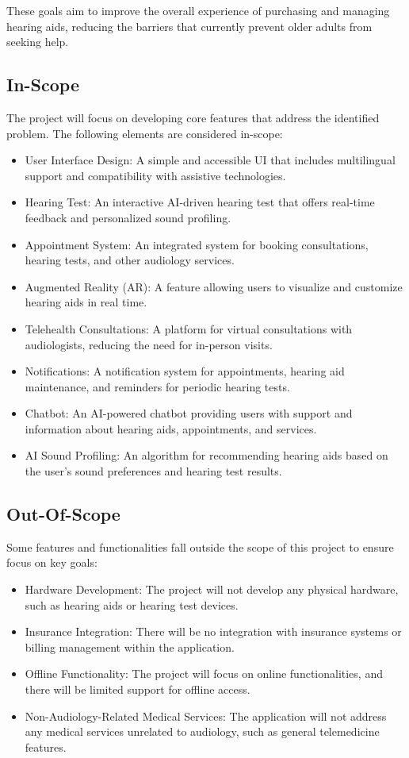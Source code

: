 \documentclass{article}
\begin{document}
These goals aim to improve the overall experience of purchasing and managing hearing aids, reducing the barriers that currently prevent older adults from seeking help.


\subsection{In-Scope}
The project will focus on developing core features that address the identified problem. The following elements are considered in-scope: \begin{itemize} \item User Interface Design: A simple and accessible UI that includes multilingual support and compatibility with assistive technologies. \item Hearing Test: An interactive AI-driven hearing test that offers real-time feedback and personalized sound profiling. \item Appointment System: An integrated system for booking consultations, hearing tests, and other audiology services. \item Augmented Reality (AR): A feature allowing users to visualize and customize hearing aids in real time. \item Telehealth Consultations: A platform for virtual consultations with audiologists, reducing the need for in-person visits. \item Notifications: A notification system for appointments, hearing aid maintenance, and reminders for periodic hearing tests. \item Chatbot: An AI-powered chatbot providing users with support and information about hearing aids, appointments, and services. \item AI Sound Profiling: An algorithm for recommending hearing aids based on the user's sound preferences and hearing test results. \end{itemize}

\subsection{Out-Of-Scope}
Some features and functionalities fall outside the scope of this project to ensure focus on key goals: \begin{itemize} \item Hardware Development: The project will not develop any physical hardware, such as hearing aids or hearing test devices. \item Insurance Integration: There will be no integration with insurance systems or billing management within the application. \item Offline Functionality: The project will focus on online functionalities, and there will be limited support for offline access. \item Non-Audiology-Related Medical Services: The application will not address any medical services unrelated to audiology, such as general telemedicine features. \end{itemize}
\end{document}
